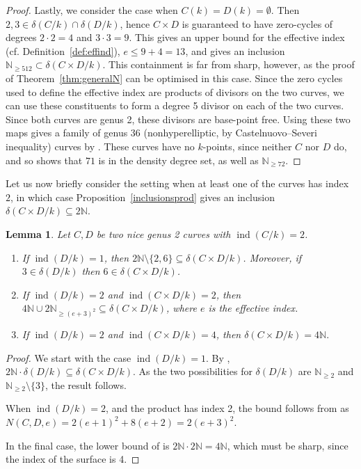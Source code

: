 \documentclass[a4paper,11pt]{amsart}
\theoremstyle{plain}
\newtheorem{lemma}[thm]{Lemma}
\theoremstyle{remark}
\newcommand{\nn}{\mathbb{N}}
\newcommand{\dendegs}{\delta}
\newcommand{\ind}{\operatorname{ind}}
\begin{document}
\begin{proof}
Lastly, we consider the case when $C(k)=D(k)=\emptyset$. Then $2,3\in\dendegs(C/k)\cap\dendegs(D/k)$, hence $C\times D$ is guaranteed to have zero-cycles of degrees $2\cdot 2=4$ and $3\cdot 3=9$. This gives an upper bound for the effective index (cf. Definition~\ref{def:effind}),
$e\leq 9+ 4=13$, and  gives an inclusion 
$\nn_{\geq 512}\subset\dendegs(C\times D/k)$. This containment is far from sharp, however, as the proof of Theorem~\ref{thm:generalN} can be optimised in this case. Since the zero cycles used to define the effective index are products of divisors on the two curves, we can use these constituents to form a degree 5 divisor on each of the two curves. Since both curves are genus 2, these divisors are base-point free. Using these two maps gives a family of genus 36 (nonhyperelliptic, by Castelnuovo--Severi inequality) curves by . These curves have no $k$-points, since neither $C$ nor $D$ do, and so  shows that $71$ is in the density degree set, as well as $\nn_{\geq 72}$.
\end{proof}

Let us now briefly consider the setting when at least one of the curves has index $2$, in which case Proposition~\ref{inclusionsprod} gives an inclusion $\dendegs(C\times D/k)\subseteq 2\nn$.
\begin{lemma}
Let $C,D$ be two nice genus 2 curves with $\ind(C/k)=2$. 

\begin{enumerate}
    \item If $\ind(D/k)=1$, then $2\mathbb{N}\setminus \{2,6\} \subseteq \dendegs(C\times D/k)$.
    Moreover, if $3\in \dendegs(D/k)$ then $6 \in \dendegs(C \times D / k)$.
    \item If $\ind(D / k) = 2$ and $\ind(C \times D / k) = 2$, then $4\nn \cup 2\nn_{\geq (e + 3)^2} \subseteq \dendegs(C \times D / k)$, where $e$ is the effective index.
    \item If $\ind(D / k) = 2$ and $\ind(C \times D / k) = 4$, then $\dendegs(C \times D / k) = 4\nn.$
\end{enumerate}
\end{lemma}

\begin{proof}
We start with the case $\ind(D / k) = 1$. By , $2\nn \cdot \dendegs(D / k) \subseteq \dendegs(C \times D / k)$. As the two possibilities for $\dendegs(D / k)$ are $\nn_{\geq 2}$ and $\nn_{\geq 2} \setminus \{3\}$, the result follows.

When $\ind(D / k) = 2$, and the product has index 2, the bound follows from  as $N(C, D, e) = 2(e + 1)^2 + 8(e + 2) = 2(e + 3)^2$.

In the final case, the lower bound of  is $2 \nn \cdot 2 \nn = 4\nn$, which must be sharp, since the index of the surface is 4. 
\end{proof}
\end{document}
